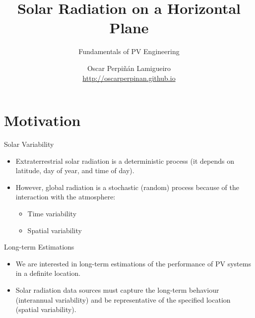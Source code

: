 \documentclass[xcolor={usenames,svgnames,dvipsnames}]{beamer}
\author{Oscar Perpiñán Lamigueiro \\ \url{http://oscarperpinan.github.io}}
\date{}
\title{Solar Radiation on a Horizontal Plane}
\subtitle{Fundamentals of PV Engineering}
\begin{document}
\maketitle

\section{Motivation}
\label{sec:orgf902906}
\begin{frame}[label={sec:org8e4a1f3}]{Solar Variability}
\begin{itemize}
\item Extraterrestrial solar radiation is a deterministic process (it depends on latitude, day of year, and time of day).
\item However, global radiation is a stochastic (random) process because of the interaction with the atmosphere:
\begin{itemize}
\item Time variability
\item Spatial variability
\end{itemize}
\end{itemize}
\end{frame}
\begin{frame}[label={sec:orgbcdbe4d}]{Long-term Estimations}
\begin{itemize}
\item We are interested in \alert{long-term estimations} of the performance of PV systems in a definite location.
\item Solar radiation data sources must \alert{capture the long-term behaviour} (interannual variability) and be \alert{representative of the specified location} (spatial variability).
\end{itemize}
\end{frame}
\end{document}
